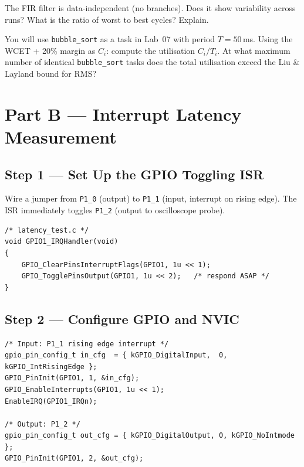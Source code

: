 \documentclass[11pt, a4paper]{article}
\begin{document}
\begin{questionbox}[~A2]
  The FIR filter is data-independent (no branches). Does it show variability across
  runs? What is the ratio of worst to best cycles? Explain.
\end{questionbox}

\begin{questionbox}[~A3]
  You will use \texttt{bubble\_sort} as a task in Lab~07 with period $T = 50$\,ms.
  Using the WCET + 20\% margin as $C_i$: compute the utilisation $C_i / T_i$. At what
  maximum number of identical \texttt{bubble\_sort} tasks does the total utilisation
  exceed the Liu \& Layland bound for RMS?
\end{questionbox}

\section{Part B --- Interrupt Latency Measurement}

\subsection{Step 1 --- Set Up the GPIO Toggling ISR}

Wire a jumper from \texttt{P1\_0} (output) to \texttt{P1\_1} (input, interrupt on rising
edge). The ISR immediately toggles \texttt{P1\_2} (output to oscilloscope probe).

\begin{lstlisting}[style=cstyle]
/* latency_test.c */
void GPIO1_IRQHandler(void)
{
    GPIO_ClearPinsInterruptFlags(GPIO1, 1u << 1);
    GPIO_TogglePinsOutput(GPIO1, 1u << 2);   /* respond ASAP */
}
\end{lstlisting}

\subsection{Step 2 --- Configure GPIO and NVIC}

\begin{lstlisting}[style=cstyle]
/* Input: P1_1 rising edge interrupt */
gpio_pin_config_t in_cfg  = { kGPIO_DigitalInput,  0, kGPIO_IntRisingEdge };
GPIO_PinInit(GPIO1, 1, &in_cfg);
GPIO_EnableInterrupts(GPIO1, 1u << 1);
EnableIRQ(GPIO1_IRQn);

/* Output: P1_2 */
gpio_pin_config_t out_cfg = { kGPIO_DigitalOutput, 0, kGPIO_NoIntmode };
GPIO_PinInit(GPIO1, 2, &out_cfg);
\end{lstlisting}
\end{document}
